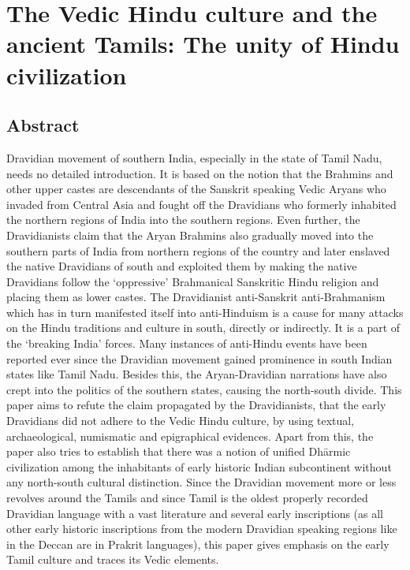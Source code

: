 
\chapter{The Vedic Hindu culture and the ancient Tamils: The unity of Hindu civilization}



\section*{Abstract}

Dravidian movement of southern India, especially in the state of Tamil Nadu, needs no detailed introduction. It is based on the notion that the Brahmins and other upper castes are descendants of the Sanskrit speaking Vedic Aryans who invaded from Central Asia and fought off the Dravidians who formerly inhabited the northern regions of India into the southern regions. Even further, the Dravidianists claim that the Aryan Brahmins also gradually moved into the southern parts of India from northern regions of the country and later enslaved the native Dravidians of south and exploited them by making the native Dravidians follow the `oppressive' Brahmanical Sanskritic Hindu religion and placing them as lower castes. The Dravidianist anti-Sanskrit anti-Brahmanism which has in turn manifested itself into anti-Hinduism is a cause for many attacks on the Hindu traditions and culture in south, directly or indirectly. It is a part of the ‘breaking India’ forces. Many instances of anti-Hindu events have been reported ever since the Dravidian movement gained prominence in south Indian states like Tamil Nadu. Besides this, the Aryan-Dravidian narrations have also crept into the politics of the southern states, causing the north-south divide. This paper aims to refute the claim propagated by the Dravidianists, that the early Dravidians did not adhere to the Vedic Hindu culture, by using textual, archaeological, numismatic and epigraphical evidences. Apart from this, the paper also tries to establish that there was a notion of unified Dhārmic civilization among the inhabitants of early historic Indian subcontinent without any north-south cultural distinction. Since the Dravidian movement more or less revolves around the Tamils and since Tamil is the oldest properly recorded Dravidian language with a vast literature and several early inscriptions (as all other early historic inscriptions from the modern Dravidian speaking regions like in the Deccan are in Prakrit languages), this paper gives emphasis on the early Tamil culture and traces its Vedic elements.


